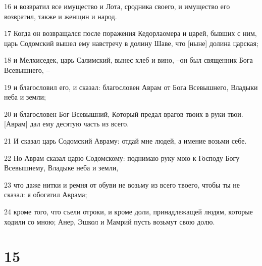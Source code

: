 \par 16 и возвратил все имущество и Лота, сродника своего, и имущество его возвратил, также и женщин и народ.
\par 17 Когда он возвращался после поражения Кедорлаомера и царей, бывших с ним, царь Содомский вышел ему навстречу в долину Шаве, что [ныне] долина царская;
\par 18 и Мелхиседек, царь Салимский, вынес хлеб и вино, --он был священник Бога Всевышнего, --
\par 19 и благословил его, и сказал: благословен Аврам от Бога Всевышнего, Владыки неба и земли;
\par 20 и благословен Бог Всевышний, Который предал врагов твоих в руки твои. [Аврам] дал ему десятую часть из всего.
\par 21 И сказал царь Содомский Авраму: отдай мне людей, а имение возьми себе.
\par 22 Но Аврам сказал царю Содомскому: поднимаю руку мою к Господу Богу Всевышнему, Владыке неба и земли,
\par 23 что даже нитки и ремня от обуви не возьму из всего твоего, чтобы ты не сказал: я обогатил Аврама;
\par 24 кроме того, что съели отроки, и кроме доли, принадлежащей людям, которые ходили со мною; Анер, Эшкол и Мамрий пусть возьмут свою долю.

\chapter{15}

